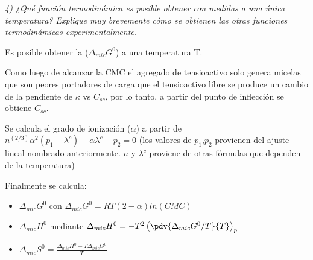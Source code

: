 \bigskip
\textit{4) ¿Qué función termodinámica es posible obtener con medidas a una única temperatura? Explique muy brevemente cómo se obtienen las otras funciones termodinámicas experimentalmente.}
\bigskip

Es posible obtener la ($\Delta_{mic}G^0$) a una temperatura T.

Como luego de alcanzar la CMC el agregado de tensioactivo solo genera micelas que son peores portadores de carga que el tensioactivo libre se produce un cambio de la pendiente de $\kappa$ vs $C_{sc}$, por lo tanto, a partir del punto de inflección se obtiene $C_{sc}$.

Se calcula el grado de ionización ($\alpha$) a partir de $n^(2/3)\alpha^2(p_1-\lambda^c)+\alpha\lambda^c-p_2=0$ (los valores de $p_1$,$p_2$ provienen del ajuste lineal nombrado anteriormente. $n$ y $\lambda^c$ proviene de otras fórmulas que dependen de la temperatura)

Finalmente se calcula:
\begin{itemize}
    \item $\Delta_{mic}G^0$ con $\Delta_{mic}G^0=RT(2-\alpha)ln(CMC)$
    \item $\Delta_{mic}H^0$ mediante $\Delta_{mic}H^0=-T^2\left(\pdv{\Delta_{mic}G^0/T}{T}\right)_p$
    \item $\Delta_{mic}S^0=\frac{\Delta_{mic}H^0-T\Delta_{mic}G^0}{T}$
\end{itemize}
